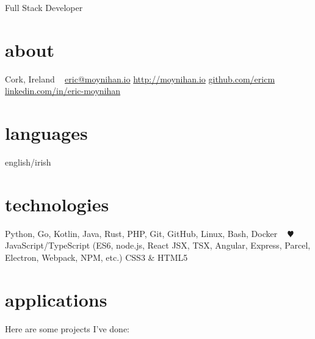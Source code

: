 \documentclass[10pt]{friggeri-cv}
\begin{document}
       {Full Stack Developer}


\begin{aside}
  \section{about}
    Cork,
    Ireland
    ~
    \href{mailto:eric@moynihan.io}{eric@moynihan.io}
    \href{http://moynihan.io}{http://moynihan.io}
    \href{http://github.com/ericm}{github.com/ericm}
    \href{https://www.linkedin.com/in/eric-moynihan}{linkedin.com/in/eric-moynihan}
  \section{languages}
    english/irish
  \section{technologies}
    Python, Go, Kotlin,
    Java, Rust, PHP,
    Git, GitHub,
    Linux, Bash, Docker
    ~
    {\color{red} $\varheartsuit$} JavaScript/TypeScript
    (ES6, node.js, React JSX, TSX, Angular, Express, Parcel, Electron, Webpack, NPM, etc.)
    CSS3 \& HTML5
    
\end{aside}

\section{applications}

Here are some projects I've done:
\end{document}
